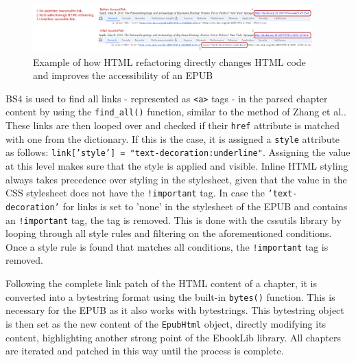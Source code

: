 \begin{figure}[h!]
\includegraphics[width=0.96\textwidth,keepaspectratio]{media/images/refactorexample2.png}
\caption{Example of how HTML refactoring directly changes HTML code and improves the accessibility of an EPUB}
\centering
\label{figure:refactorexample}
\end{figure}

BS4 is used to find all links - represented as \texttt{<a>} tags - in the parsed chapter content by using the \texttt{find\_all()} function, similar to the method of Zhang et al.\cite{Zhang2024}. These links are then looped over and checked if their \texttt{href} attribute is matched with one from the dictionary. If this is the case, it is assigned a \texttt{style} attribute as follows: \texttt{link['style'] = "text-decoration:underline"}. Assigning the value at this level makes sure that the style is applied and visible. Inline HTML styling always takes precedence over styling in the stylesheet, given that the value in the CSS stylesheet does not have the \texttt{!important} tag. In case the \texttt{'text-decoration'} for links is set to 'none' in the stylesheet of the EPUB and contains an \texttt{!important} tag, the tag is removed. This is done with the cssutils library by looping through all style rules and filtering on the aforementioned conditions. Once a style rule is found that matches all conditions, the \texttt{!important} tag is removed.

Following the complete link patch of the HTML content of a chapter, it is converted into a bytestring format using the built-in \texttt{bytes()} function. This is necessary for the EPUB as it also works with bytestrings. This bytestring object is then set as the new content of the \texttt{EpubHtml} object, directly modifying its content, highlighting another strong point of the EbookLib library. All chapters are iterated and patched in this way until the process is complete.


